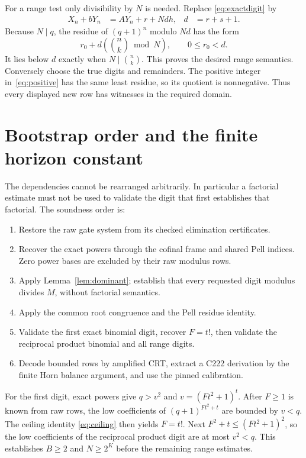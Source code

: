 \documentclass[11pt,letterpaper]{article}
\theoremstyle{remark}\newtheorem{remark}[theorem]{Remark}
\begin{document}
For a range test only divisibility by \(N\) is needed. Replace
\eqref{eq:exactdigit} by
\begin{align}
 X_n+bY_n&=AY_n+r+Nd h,&d&=r+s+1. \label{eq:rangedigit}
\end{align}
Because \(N\mid q\), the residue of \((q+1)^n\) modulo \(Nd\)
has the form
\[
 r_0+d\left(\binom nk\bmod N\right),\qquad 0\le r_0<d.
\]
It lies below \(d\) exactly when \(N\mid\binom nk\). This proves
the desired range semantics. Conversely choose the true digits and
remainders. The positive integer in~\eqref{eq:positive} has the same
least residue, so its quotient is nonnegative. Thus every displayed
new row has witnesses in the required domain.

\section{Bootstrap order and the finite horizon constant}

The dependencies cannot be rearranged arbitrarily. In particular a
factorial estimate must not be used to validate the digit that first
establishes that factorial. The soundness order is:

\begin{enumerate}
\item Restore the raw gate system from its checked elimination certificates.
\item Recover the exact powers through the cofinal frame and shared Pell
      indices. Zero power bases are excluded by their raw modulus rows.
\item Apply Lemma~\ref{lem:dominant}; establish that every requested digit
      modulus divides \(M\), without factorial semantics.
\item Apply the common root congruence and the Pell residue identity.
\item Validate the first exact binomial digit, recover \(F=t!\), then
      validate the reciprocal product binomial and all range digits.
\item Decode bounded rows by amplified CRT, extract a C222 derivation by
      the finite Horn balance argument, and use the pinned calibration.
\end{enumerate}

For the first digit, exact powers give \(q>v^2\) and \(v=(Ft^2+1)^t\).
After \(F\ge1\) is known from raw rows, the low coefficients of
\((q+1)^{Ft^2+t}\) are bounded by \(v<q\). The ceiling identity
\eqref{eq:ceiling} then yields \(F=t!\). Next
\(F^2+t\le(Ft^2+1)^2\), so the low coefficients of the reciprocal
product digit are at most \(v^2<q\). This establishes \(B\ge2\)
and \(N\ge2^K\) before the remaining range estimates.
\end{document}
